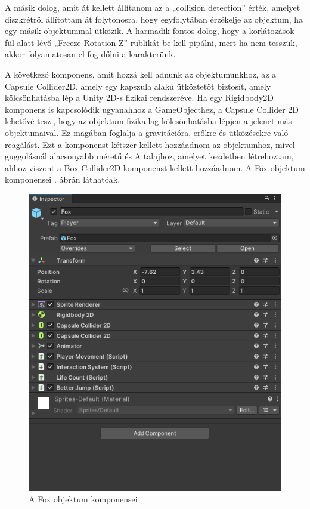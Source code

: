 A másik dolog, amit át kellett állítanom az a „collision detection” érték, amelyet diszkrétről állítottam át folytonosra, hogy egyfolytában érzékelje az objektum, ha egy másik objektummal ütközik. A harmadik fontos dolog, hogy a korlátozások fül alatt lévő „Freeze Rotation Z” rublikát be kell pipálni, mert ha nem tesszük, akkor folyamatosan el fog dőlni a karakterünk.

 A következő komponens, amit hozzá kell adnunk az objektumunkhoz, az a Capsule Collider2D, amely egy kapszula alakú ütköztetőt biztosít, amely kölcsönhatásba lép a Unity 2D-s fizikai rendszeréve. Ha egy Rigidbody2D komponens is kapcsolódik ugyanahhoz a GameObjecthez, a Capsule Collider 2D lehetővé teszi, hogy az objektum fizikailag kölcsönhatásba lépjen a jelenet más objektumaival. Ez magában foglalja a gravitációra, erőkre és ütközésekre való reagálást. Ezt a komponenst kétszer kellett hozzáadnom az objektumhoz, mivel guggolásnál alacsonyabb méretű és  A talajhoz, amelyet kezdetben létrehoztam, ahhoz viszont a Box Collider2D komponenst kellett hozzáadnom.\cite{unityrigidbody2d} A Fox objektum komponensei . ábrán láthatóak.

\begin{figure}[ht]
\centering
\includegraphics[scale = 0.4]{images/foxcomponents.png}
\caption{A Fox objektum komponensei}
\label{fig:foxcomponents}
\end{figure}
\newpage
{}

